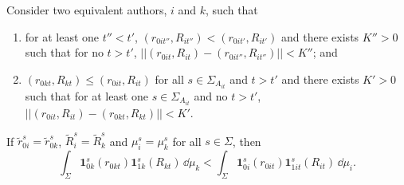 \begin{lemma}\label{Lemma5}
	Consider two equivalent authors, $i$ and $k$, such that
	\begin{enumerate}
		\item for at least one $t''<t'$, $(r_{0it''},R_{it''})<(r_{0it'},R_{it'})$ and there exists $K''>0$ such that for no $t>t'$, $||(r_{0it},R_{it})-(r_{0it''},R_{it''})||<K''$; and
		\item $(r_{0kt},R_{kt})\le(r_{0it},R_{it})$ for all $s\in\Sigma_{A_{it}}$ and $t>t'$ and there exists $K'>0$ such that for at least one $s\in\Sigma_{A_{it}}$ and no $t>t'$, $||(r_{0it},R_{it})-(r_{0kt},R_{kt})||<K'$.
	\end{enumerate}
	If $\widetilde r_{0i}^s=\widetilde r_{0k}^s$, $\widetilde R_i^s=\widetilde R_k^s$ and $\mu_i^s=\mu_k^s$ for all $s\in\Sigma$, then
\begin{equation}\label{equationA13}
	\int_\Sigma\!\bm1_{0k}^s(r_{0kt})\bm1_{1k}^s(R_{kt})\,\dd\mu_k<\int_\Sigma\!\bm1_{0i}^s(r_{0it})\bm1_{1it}^s(R_{it})\,\dd\mu_i.
\end{equation}
\end{lemma}
